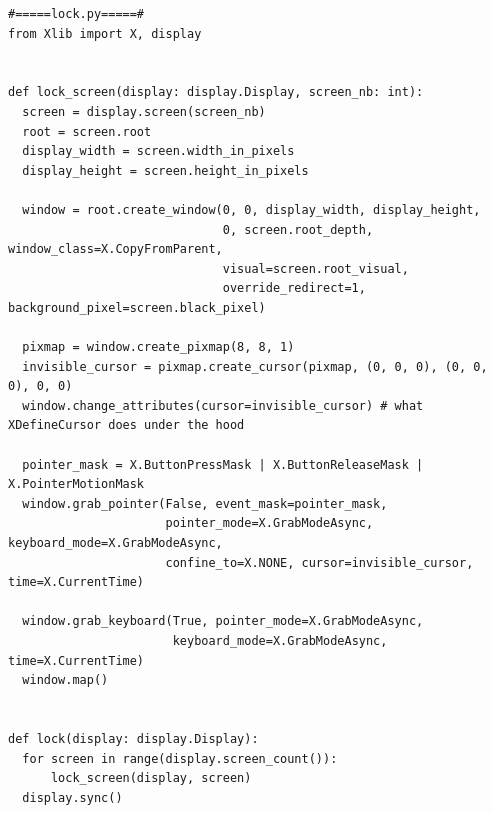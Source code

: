 \documentclass[french]{report}
\begin{document}
\begin{verbatim}
#=====lock.py=====#
from Xlib import X, display


def lock_screen(display: display.Display, screen_nb: int):
  screen = display.screen(screen_nb)
  root = screen.root
  display_width = screen.width_in_pixels
  display_height = screen.height_in_pixels

  window = root.create_window(0, 0, display_width, display_height,
                              0, screen.root_depth, window_class=X.CopyFromParent,
                              visual=screen.root_visual,
                              override_redirect=1, background_pixel=screen.black_pixel)

  pixmap = window.create_pixmap(8, 8, 1)
  invisible_cursor = pixmap.create_cursor(pixmap, (0, 0, 0), (0, 0, 0), 0, 0)
  window.change_attributes(cursor=invisible_cursor) # what XDefineCursor does under the hood

  pointer_mask = X.ButtonPressMask | X.ButtonReleaseMask | X.PointerMotionMask
  window.grab_pointer(False, event_mask=pointer_mask,
                      pointer_mode=X.GrabModeAsync, keyboard_mode=X.GrabModeAsync,
                      confine_to=X.NONE, cursor=invisible_cursor, time=X.CurrentTime)

  window.grab_keyboard(True, pointer_mode=X.GrabModeAsync,
                       keyboard_mode=X.GrabModeAsync, time=X.CurrentTime)
  window.map()


def lock(display: display.Display):
  for screen in range(display.screen_count()):
      lock_screen(display, screen)
  display.sync()

\end{verbatim}
\newpage
\end{document}
